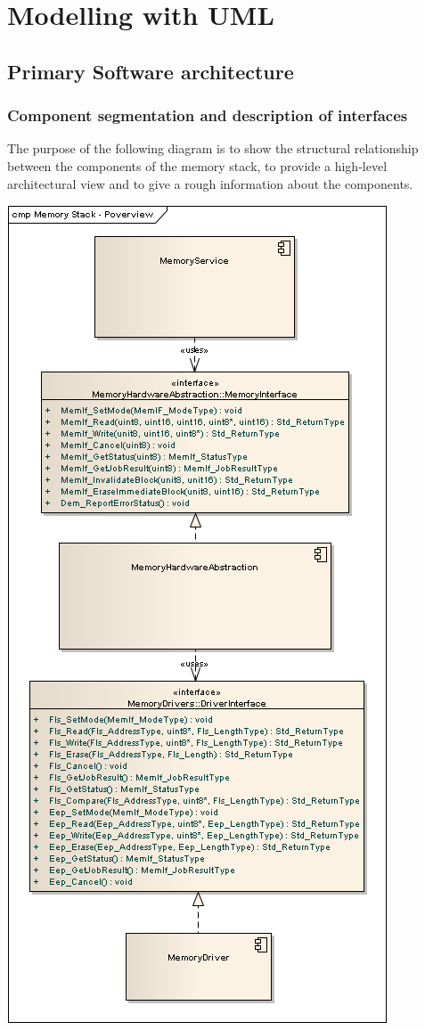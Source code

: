 \section{Modelling with UML}
\subsection{Primary Software architecture}
\subsubsection{Component segmentation and description of interfaces}
The purpose of the following diagram is to show the structural relationship between the components of the memory stack, to provide a high-level architectural view and to give a rough information about the components.\\
\begin{center}
\includegraphics[scale=0.55]{Images/Memory_Stack_POverview.png}
\end{center}
